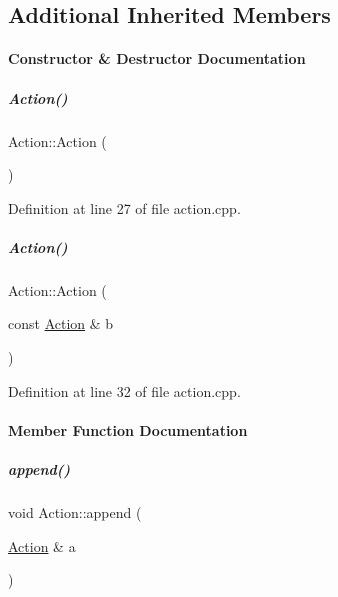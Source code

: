 \subsection*{Additional Inherited Members}


\paragraph{Constructor \& Destructor Documentation}
\mbox{\label{group__icubclient__representations_a4f457ccfc8336b565cadca56b36e0271}} 
\subparagraph{\texorpdfstring{Action()}{Action()}\hspace{0.1cm}{\footnotesize\ttfamily [1/2]}}
{\footnotesize\ttfamily Action\+::\+Action (\begin{DoxyParamCaption}{ }\end{DoxyParamCaption})}



Definition at line 27 of file action.\+cpp.

\mbox{\label{group__icubclient__representations_a97702e22855a0b37743229d444cd0e95}} 
\subparagraph{\texorpdfstring{Action()}{Action()}\hspace{0.1cm}{\footnotesize\ttfamily [2/2]}}
{\footnotesize\ttfamily Action\+::\+Action (\begin{DoxyParamCaption}\item[{const \hyperlink{group__icubclient__representations_classicubclient_1_1Action}{Action} \&}]{b }\end{DoxyParamCaption})}



Definition at line 32 of file action.\+cpp.



\paragraph{Member Function Documentation}
\mbox{\label{group__icubclient__representations_a1d7d32ec1d32736fc22c6fb78c653c5b}} 
\subparagraph{\texorpdfstring{append()}{append()}}
{\footnotesize\ttfamily void Action\+::append (\begin{DoxyParamCaption}\item[{\hyperlink{group__icubclient__representations_classicubclient_1_1Action}{Action} \&}]{a }\end{DoxyParamCaption})}



